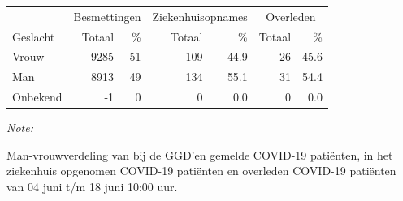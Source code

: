 \documentclass[
  english,
  man,floatsintext]{apa6}
\begin{document}
\begin{table}
\centering\begingroup\fontsize{11}{13}\selectfont

\begin{threeparttable}
\begin{tabular}{lrrrrrr}
\toprule
\multicolumn{1}{c}{ } & \multicolumn{2}{c}{Besmettingen} & \multicolumn{2}{c}{Ziekenhuisopnames} & \multicolumn{2}{c}{Overleden} \\
\cmidrule(l{3pt}r{3pt}){2-3} \cmidrule(l{3pt}r{3pt}){4-5} \cmidrule(l{3pt}r{3pt}){6-7}
Geslacht & Totaal & \% & Totaal & \% & Totaal & \%\\
\midrule
Vrouw & 9285 & 51 & 109 & 44.9 & 26 & 45.6\\
Man & 8913 & 49 & 134 & 55.1 & 31 & 54.4\\
Onbekend & -1 & 0 & 0 & 0.0 & 0 & 0.0\\
\bottomrule
\end{tabular}
\begin{tablenotes}
\item \textit{Note: } 
\item Man-vrouwverdeling van bij de GGD’en gemelde COVID-19 patiënten, in het ziekenhuis opgenomen COVID-19 patiënten en overleden COVID-19 patiënten van 04 juni t/m 18 juni 10:00 uur.
\end{tablenotes}
\end{threeparttable}
\endgroup{}
\end{table}
\newpage
\end{document}
